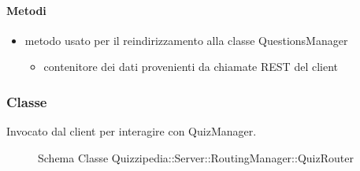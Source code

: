 \paragraph{Metodi}
\begin{itemize}
\item {}
\newline
metodo usato per il reindirizzamento alla classe QuestionsManager
\newline
{}
\newline
\begin{itemize}
\item {}
\newline
contenitore dei dati provenienti da chiamate REST del client
\end{itemize}
\end{itemize}
\subsubsection{Classe }
Invocato dal client per interagire con QuizManager.
\begin{figure}[H]
\centering
\noindent{}
\caption[Schema Classe QuizRouter]{Schema Classe Quizzipedia::Server::RoutingManager::QuizRouter}
\end{figure}
